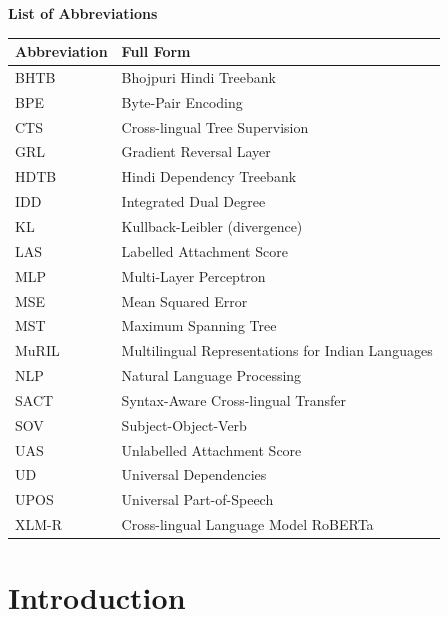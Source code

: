 \documentclass[12pt,a4paper,oneside]{report}
\begin{document}
\newpage
\thispagestyle{plain}
\begin{center}
{\Large \textbf{List of Abbreviations}}
\end{center}
\vspace{0.5cm}

\begin{tabular}{@{}lp{10cm}@{}}
\toprule
\textbf{Abbreviation} & \textbf{Full Form} \\
\midrule
BHTB  & Bhojpuri Hindi Treebank \\
BPE   & Byte-Pair Encoding \\
CTS   & Cross-lingual Tree Supervision \\
GRL   & Gradient Reversal Layer \\
HDTB  & Hindi Dependency Treebank \\
IDD   & Integrated Dual Degree \\
KL    & Kullback-Leibler (divergence) \\
LAS   & Labelled Attachment Score \\
MLP   & Multi-Layer Perceptron \\
MSE   & Mean Squared Error \\
MST   & Maximum Spanning Tree \\
MuRIL & Multilingual Representations for Indian Languages \\
NLP   & Natural Language Processing \\
SACT  & Syntax-Aware Cross-lingual Transfer \\
SOV   & Subject-Object-Verb \\
UAS   & Unlabelled Attachment Score \\
UD    & Universal Dependencies \\
UPOS  & Universal Part-of-Speech \\
XLM-R & Cross-lingual Language Model RoBERTa \\
\bottomrule
\end{tabular}

\newpage
{}
\setcounter{page}{1}

\chapter{Introduction}
\label{chap:intro}
\end{document}

